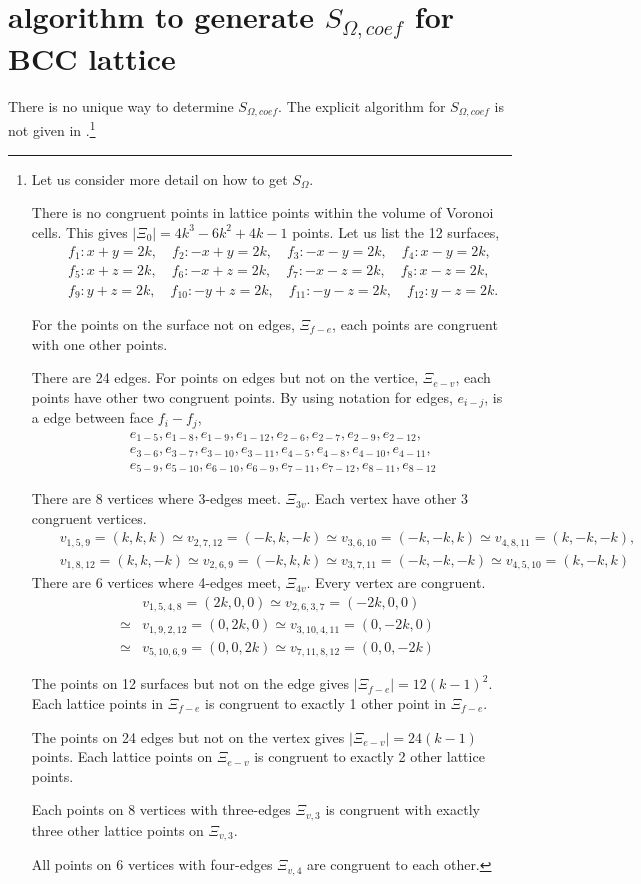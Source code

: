 \documentclass[10pt]{book}
\newcommand{\bea}{\begin{eqnarray}}
\newcommand{\eea}{\end{eqnarray}}
\newcommand{\no}{\nonumber \\}
\begin{document}
\section{algorithm to generate $S_{\Omega,coef}$ for BCC lattice}
There is no unique way to determine $S_{\Omega,coef}$.
The explicit algorithm for  $S_{\Omega,coef}$ is not given in \cite{Zheng}.\footnote{Let us consider more detail on how to get $S_{\Omega}$. 
	
	There is no congruent points in lattice points within the volume of Voronoi cells.
	This gives $|\Xi_0|=4k^3-6k^2+4k-1$ points. 
	Let us list the 12 surfaces,
	\bea 
	& &f_1 : x+y=2k,\quad f_2: -x+y=2k,\quad f_3:-x-y=2k,\quad f_4: x-y=2k, \no 
	& &f_5 : x+z=2k,\quad f_6: -x+z=2k,\quad f_7:-x-z=2k,\quad f_8: x-z=2k, \no
	& &f_9 : y+z=2k,\quad f_{10}: -y+z=2k,\quad f_{11}:-y-z=2k,\quad f_{12}: y-z=2k .
	\eea 
	
	For the points on the surface not on edges, $\Xi_{f-e}$, each points are 
	congruent with one other points.
	
	There are 24 edges. For points on edges but not on the vertice, $\Xi_{e-v}$, 
	each points have other two congruent points. 
	By using notation for edges, $e_{i-j}$, is a edge between face $f_{i}-f_{j}$,
	\bea 
	& &e_{1-5}, e_{1-8}, e_{1-9}, e_{1-12}, e_{2-6}, e_{2-7}, e_{2-9}, e_{2-12},\no 
	& &e_{3-6}, e_{3-7}, e_{3-10}, e_{3-11}, e_{4-5},e_{4-8}, e_{4-10},e_{4-11},\no 
	& &e_{5-9},e_{5-10}, e_{6-10},e_{6-9}, e_{7-11},e_{7-12},e_{8-11},e_{8-12}
	\eea 
	
	There are 8 vertices where 3-edges meet. $\Xi_{3v}$. Each vertex have other 3 congruent vertices.
	\bea 
	& &v_{1,5,9}=(k,k,k)\simeq v_{2,7,12}=(-k,k,-k)\simeq v_{3,6,10}=(-k,-k,k)\simeq  v_{4,8,11}=(k,-k,-k),\no 
	& &v_{1,8,12}=(k,k,-k)\simeq v_{2,6,9}=(-k,k,k)\simeq v_{3,7,11}=(-k,-k,-k)\simeq v_{4,5,10}=(k,-k,k)\nonumber 
	\eea 
	There are 6 vertices where 4-edges meet, $\Xi_{4v}$. Every vertex are congruent.
	\bea 
	& &     v_{1,5,4,8}=(2k,0,0)\simeq v_{2,6,3,7}=(-2k,0,0) \no 
	&\simeq& v_{1,9,2,12}=(0,2k,0) \simeq v_{3,10,4,11}=(0,-2k,0) \no 
	&\simeq& v_{5,10,6,9}=(0,0,2k) \simeq v_{7,11,8,12}=(0,0,-2k)
	\eea 
	
	The points on 12 surfaces but not on the edge gives $|\Xi_{f-e}|=12(k-1)^2$.
	Each lattice points in $\Xi_{f-e}$ is congruent to exactly 1 other point in
	$\Xi_{f-e}$.
	
	The points on 24 edges but not on the vertex gives $|\Xi_{e-v}|=24(k-1)$ points.
	Each lattice points on $\Xi_{e-v}$ is congruent to exactly 2 other lattice points. 
	
	Each points on 8 vertices with three-edges $\Xi_{v,3}$ is congruent with 
	exactly three other lattice points on $\Xi_{v,3}$.
	
	All points on 6 vertices with four-edges $\Xi_{v,4}$ are congruent 
	to each other. 
}
\end{document}

